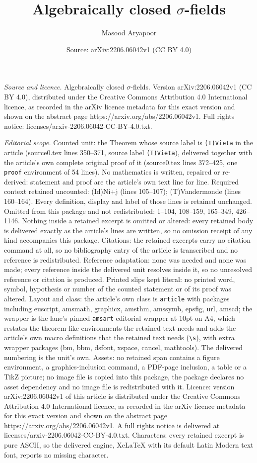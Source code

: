 \documentclass[10pt,a4paper]{amsart}
\title[Algebraically closed $\sigma$-fields]{Algebraically closed $\sigma$-fields}
\author{Masood Aryapoor}
\date{Source: arXiv:2206.06042v1 (CC BY 4.0)}
\begin{document}
\maketitle

\noindent\emph{Source and licence.} Algebraically closed $\sigma$-fields. Version arXiv:2206.06042v1 (CC BY 4.0), distributed under the Creative Commons Attribution 4.0 International licence, as recorded in the arXiv licence metadata for this exact version and shown on the abstract page https://arxiv.org/abs/2206.06042v1. Full rights notice: licenses/arxiv-2206.06042-CC-BY-4.0.txt.\par\smallskip

\noindent\textit{Editorial scope.} Counted unit: the Theorem whose source label is \texttt{(T)Vieta} in the article (source0.tex lines 350--371, source label \texttt{(T)Vieta}), delivered together with the article's own complete original proof of it (source0.tex lines 372--425, one \texttt{proof} environment of 54 lines). No mathematics is written, repaired or re-derived: statement and proof are the article's own text line for line. Required context retained uncounted: (Id)Ni+j (lines 105--107); (T)Vandermonde (lines 160--164). Every definition, display and label of those lines is retained unchanged. Omitted from this package and not redistributed: 1--104, 108--159, 165--349, 426--1146. Nothing inside a retained excerpt is omitted or altered: every retained body is delivered exactly as the article's lines are written, so no omission receipt of any kind accompanies this package. Citations: the retained excerpts carry no citation command at all, so no bibliography entry of the article is transcribed and no reference is redistributed. Reference adaptation: none was needed and none was made; every reference inside the delivered unit resolves inside it, so no unresolved reference or citation is produced. Printed slips kept literal: no printed word, symbol, hypothesis or number of the counted statement or of its proof was altered. Layout and class: the article's own class is \texttt{article} with packages including euscript, amsmath, graphicx, amsthm, amssymb, epsfig, url, amscd; the wrapper is the lane's pinned \texttt{amsart} editorial wrapper at 10pt on A4, which restates the theorem-like environments the retained text needs and adds the article's own macro definitions that the retained text needs (\texttt{\textbackslash s}), with extra wrapper packages (bm, bbm, dsfont, xspace, cancel, mathtools). The delivered numbering is the unit's own. Assets: no retained span contains a figure environment, a graphics-inclusion command, a PDF-page inclusion, a table or a TikZ picture; no image file is copied into this package, the package declares no asset dependency and no image file is redistributed with it. Licence: version arXiv:2206.06042v1 of this article is distributed under the Creative Commons Attribution 4.0 International licence, as recorded in the arXiv licence metadata for this exact version and shown on the abstract page https://arxiv.org/abs/2206.06042v1. A full rights notice is delivered at licenses/arxiv-2206.06042-CC-BY-4.0.txt. Characters: every retained excerpt is pure ASCII, so the delivered engine, XeLaTeX with its default Latin Modern text font, reports no missing character.
\end{document}
